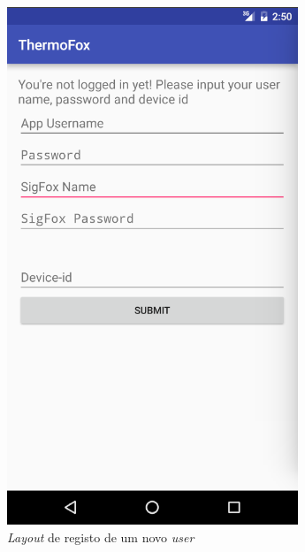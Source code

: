 \documentclass[a4paper]{article}
\begin{document}
\begin{figure}[H]
  \includegraphics[width=\linewidth]{AddDevice.png}
  \caption{\textit{Layout} de registo de um novo \textit{user}}\label{fig:newdev}
\endminipage
\end{figure}
\end{document}
